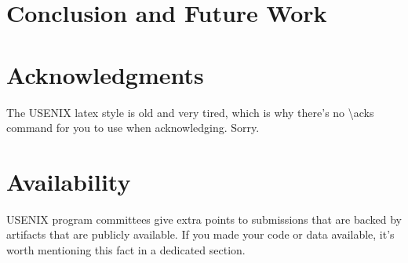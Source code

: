 \section{Conclusion and Future Work}

\section*{Acknowledgments}

The USENIX latex style is old and very tired, which is why
there's no \textbackslash{}acks command for you to use when
acknowledging. Sorry.

\section*{Availability}

USENIX program committees give extra points to submissions that are
backed by artifacts that are publicly available. If you made your code
or data available, it's worth mentioning this fact in a dedicated
section.






